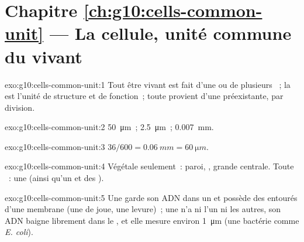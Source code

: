 \section*{Chapitre \ref{ch:g10:cells-common-unit} --- La cellule, unité commune du vivant}

\begin{solution}{exo:g10:cells-common-unit:1}
Tout être vivant est fait d'une ou de plusieurs ~; la 
est l'unité de structure et de fonction~; toute  provient d'une
 préexistante, par division.
\end{solution}

\begin{solution}{exo:g10:cells-common-unit:2}
\qty{50}{\micro m}~; \qty{2.5}{\micro m}~; \qty{0.007}{mm}.
\end{solution}

\begin{solution}{exo:g10:cells-common-unit:3}
$36/600 = \qty{0.06}{mm} = \qty{60}{\micro m}$.
\end{solution}

\begin{solution}{exo:g10:cells-common-unit:4}
Végétale seulement~: paroi, , grande  centrale.
Toute ~: une  (ainsi qu'un  et des
).
\end{solution}

\begin{solution}{exo:g10:cells-common-unit:5}
Une  garde son ADN dans un  et possède des
 entourés d'une membrane (une  de joue, une levure)~;
une  n'a ni l'un ni les autres, son ADN baigne
librement dans le , et elle mesure environ
\qty{1}{\micro m} (une bactérie comme \emph{E. coli}).
\end{solution}

